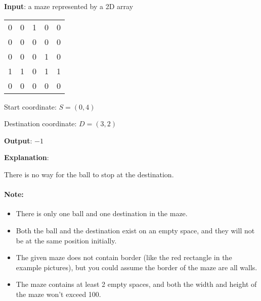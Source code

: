 \begin{flushleft}
\textbf{Input}: a maze represented by a 2D array

\begin{table}[H]
\begin{tabular}{ccccc}
0 & 0 & 1 & 0 & 0 \\
0 & 0 & 0 & 0 & 0 \\
0 & 0 & 0 & 1 & 0 \\
1 & 1 & 0 & 1 & 1 \\
0 & 0 & 0 & 0 & 0
\end{tabular}
\end{table}

Start coordinate: $S = (0, 4)$

Destination coordinate: $D = (3, 2)$

\textbf{Output}: $-1$

\textbf{Explanation}: 

There is no way for the ball to stop at the destination.


\begin{figure}[H]
\end{figure}

\end{flushleft}
 

\paragraph{Note:}

\begin{itemize}
\item There is only one ball and one destination in the maze.
\item Both the ball and the destination exist on an empty space, and they will not be at the same position initially.
\item The given maze does not contain border (like the red rectangle in the example pictures), but you could assume the border of the maze are all walls.
\item The maze contains at least 2 empty spaces, and both the width and height of the maze won't exceed 100.
\end{itemize}

